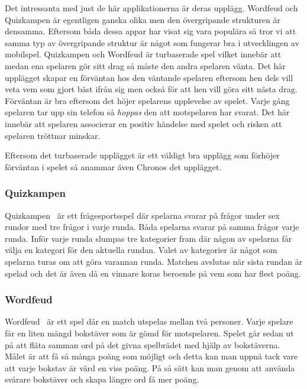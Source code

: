 \documentclass[a4paper, 11pt]{article}
\begin{document}
Det intressanta med just de här applikationerna är deras upplägg. Wordfeud och Quizkampen är egentligen ganska olika men den övergripande strukturen är densamma. Eftersom båda dessa appar har visat sig vara populära så tror vi att samma typ av övergripande struktur är något som fungerar bra i utvecklingen av mobilspel. Quizkampen och Wordfeud är turbaserade spel vilket innebär att medan ena spelaren gör sitt drag så måste den andra spelaren vänta. Det här upplägget skapar en förväntan hos den väntande spelaren eftersom hen dels vill veta vem som gjort bäst ifrån sig men också för att hen vill göra sitt nästa drag. Förväntan är bra eftersom det höjer spelarens upplevelse av spelet. Varje gång spelaren tar upp sin telefon så \textit{hoppas} den att motspelaren har svarat. Det här innebär att spelaren associerar en positiv händelse med spelet och risken att spelaren tröttnar minskar.

Eftersom det turbaserade upplägget är ett väldigt bra upplägg som förhöjer förväntan i spelet så anammar även Chronos det upplägget. 

\subsubsection{Quizkampen}
Quizkampen~\cite{aboutquiz} är ett frågesportsspel där spelarna svarar på frågor under sex rundor med tre frågor i varje runda. Båda spelarna svarar på samma frågor varje runda.  Inför varje runda slumpas tre kategorier fram där någon av spelarna får välja en kategori för den aktuella rundan. Valet av kategorier är något som spelarna turas om att göra varannan runda. Matchen avslutas när sista rundan är spelad och det är även då en vinnare koras beroende på vem som har flest poäng. 

\subsubsection{Wordfeud}
Wordfeud~\cite{aboutwordfeud} är ett spel där en match utspelas mellan två personer. Varje spelare får en liten mängd bokstäver som är gömd för motspelaren. Spelet går sedan ut på att fläta samman ord på det givna spelbrädet med hjälp av bokstäverna. Målet är att få så många poäng som möjligt och detta kan man uppnå tack vare att varje bokstav är värd en viss poäng. På så sätt kan man genom att använda svårare bokstäver och skapa längre ord få mer poäng. 
\end{document}
